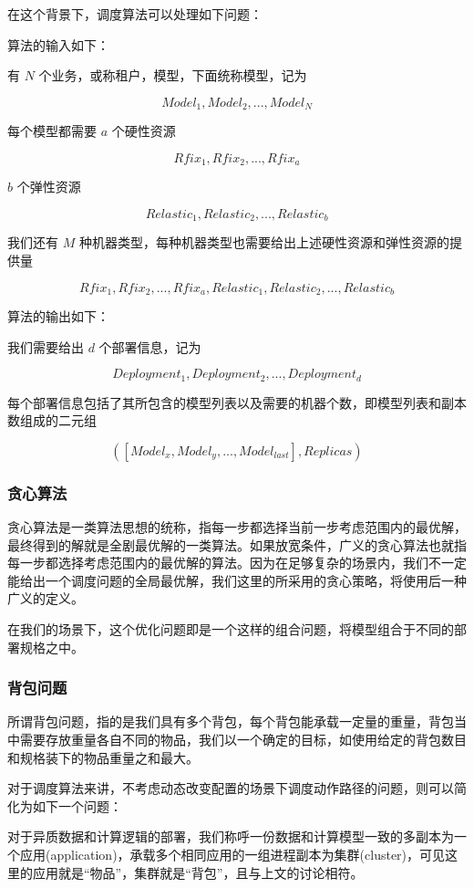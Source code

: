 在这个背景下，调度算法可以处理如下问题：

算法的输入如下：

有 $N$ 个业务，或称租户，模型，下面统称模型，记为

$$Model_1,Model_2,...,Model_N$$

每个模型都需要 $a$ 个硬性资源

$$Rfix_1,Rfix_2,...,Rfix_a$$

$b$ 个弹性资源

$$Relastic_1,Relastic_2,...,Relastic_b$$

我们还有 $M$ 种机器类型，每种机器类型也需要给出上述硬性资源和弹性资源的提供量

$$Rfix_1,Rfix_2,...,Rfix_a,Relastic_1,Relastic_2,...,Relastic_b$$

算法的输出如下：

我们需要给出 $d$ 个部署信息，记为

$$Deployment_1,Deployment_2,...,Deployment_d$$

每个部署信息包括了其所包含的模型列表以及需要的机器个数，即模型列表和副本数组成的二元组

$$([Model_x,Model_y,...,Model_{last}],Replicas)$$

\subsubsection{贪心算法}

贪心算法是一类算法思想的统称，指每一步都选择当前一步考虑范围内的最优解，最终得到的解就是全剧最优解的一类算法。如果放宽条件，广义的贪心算法也就指每一步都选择考虑范围内的最优解的算法。因为在足够复杂的场景内，我们不一定能给出一个调度问题的全局最优解，我们这里的所采用的贪心策略，将使用后一种广义的定义。

在我们的场景下，这个优化问题即是一个这样的组合问题，将模型组合于不同的部署规格之中。

\subsubsection{背包问题}

所谓背包问题，指的是我们具有多个背包，每个背包能承载一定量的重量，背包当中需要存放重量各自不同的物品，我们以一个确定的目标，如使用给定的背包数目和规格装下的物品重量之和最大。

对于调度算法来讲，不考虑动态改变配置的场景下调度动作路径的问题，则可以简化为如下一个问题：

对于异质数据和计算逻辑的部署，我们称呼一份数据和计算模型一致的多副本为一个应用(application)，承载多个相同应用的一组进程副本为集群(cluster)，可见这里的应用就是“物品”，集群就是“背包”，且与上文的讨论相符。

